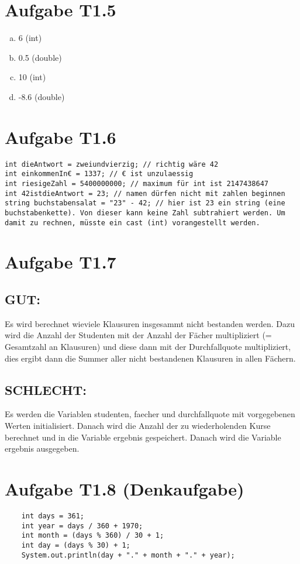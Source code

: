 \documentclass[final,a4paper]{article}
\begin{document}
\section*{Aufgabe T1.5}
\begin{enumerate}[(a)]
\item 6 	(int)
\item 0.5 	(double)
\item 10 	(int)
\item -8.6 	(double)
\end{enumerate}
\section*{Aufgabe T1.6}
\begin{lstlisting}
int dieAntwort = zweiundvierzig; // richtig wäre 42
int einkommenIn€ = 1337; // € ist unzulaessig
int riesigeZahl = 5400000000; // maximum für int ist 2147438647
int 42istdieAntwort = 23; // namen dürfen nicht mit zahlen beginnen
string buchstabensalat = "23" - 42; // hier ist 23 ein string (eine buchstabenkette). Von dieser kann keine Zahl subtrahiert werden. Um damit zu rechnen, müsste ein cast (int) vorangestellt werden.
\end{lstlisting}
\section*{Aufgabe T1.7}
\subsection*{GUT:}
Es wird berechnet wieviele Klausuren insgesammt nicht bestanden werden. Dazu wird die Anzahl der Studenten mit der Anzahl der Fächer multipliziert (= Gesamtzahl an Klausuren) und diese dann mit der Durchfallquote multipliziert, dies ergibt dann die Summer aller nicht bestandenen Klausuren in allen Fächern.

\subsection*{SCHLECHT:}
Es werden die Variablen studenten, faecher und durchfallquote mit vorgegebenen Werten initialisiert. Danach wird die Anzahl der zu wiederholenden Kurse berechnet und in die Variable ergebnis gespeichert. Danach wird die Variable ergebnis ausgegeben.
\section*{Aufgabe T1.8 (Denkaufgabe)}
\begin{lstlisting}
	int days = 361;
	int year = days / 360 + 1970;
	int month = (days % 360) / 30 + 1;
	int day = (days % 30) + 1;
	System.out.println(day + "." + month + "." + year);
\end{lstlisting}
\end{document}
